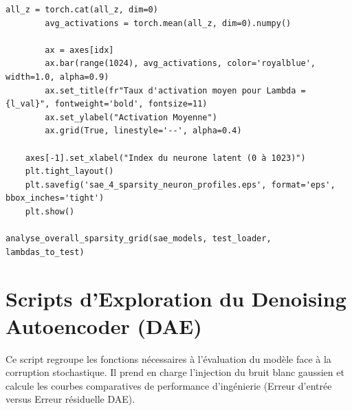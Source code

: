 \documentclass[11pt,a4paper]{report}
\begin{document}
\begin{lstlisting}[caption=Pipeline d'exploration et d'analyse des profils du SAE]
        all_z = torch.cat(all_z, dim=0)
        avg_activations = torch.mean(all_z, dim=0).numpy()
        
        ax = axes[idx]
        ax.bar(range(1024), avg_activations, color='royalblue', width=1.0, alpha=0.9)
        ax.set_title(fr"Taux d'activation moyen pour Lambda = {l_val}", fontweight='bold', fontsize=11)
        ax.set_ylabel("Activation Moyenne")
        ax.grid(True, linestyle='--', alpha=0.4)
        
    axes[-1].set_xlabel("Index du neurone latent (0 à 1023)")
    plt.tight_layout()
    plt.savefig('sae_4_sparsity_neuron_profiles.eps', format='eps', bbox_inches='tight')
    plt.show()

analyse_overall_sparsity_grid(sae_models, test_loader, lambdas_to_test)
\end{lstlisting}

\chapter{Scripts d'Exploration du Denoising Autoencoder (DAE)}

Ce script regroupe les fonctions nécessaires à l'évaluation du modèle face à la corruption stochastique. Il prend en charge l'injection du bruit blanc gaussien et calcule les courbes comparatives de performance d'ingénierie (Erreur d'entrée versus Erreur résiduelle DAE).
\end{document}
